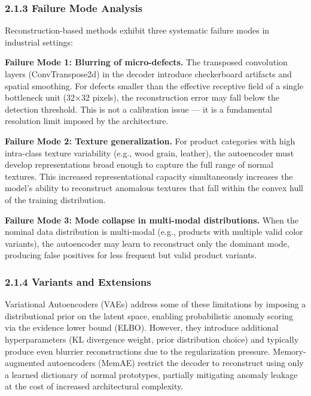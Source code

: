 \documentclass[12pt, a4paper, oneside]{report}
\begin{document}
\subsubsection{2.1.3 Failure Mode Analysis}\label{failure-mode-analysis}

Reconstruction-based methods exhibit three systematic failure modes in industrial settings:

\textbf{Failure Mode 1: Blurring of micro-defects.} The transposed convolution layers (ConvTranspose2d) in the decoder introduce checkerboard artifacts and spatial smoothing. For defects smaller than the effective receptive field of a single bottleneck unit (32$\times$32 pixels), the reconstruction error may fall below the detection threshold. This is not a calibration issue --- it is a fundamental resolution limit imposed by the architecture.

\textbf{Failure Mode 2: Texture generalization.} For product categories with high intra-class texture variability (e.g., wood grain, leather), the autoencoder must develop representations broad enough to capture the full range of normal textures. This increased representational capacity simultaneously increases the model's ability to reconstruct anomalous textures that fall within the convex hull of the training distribution.

\textbf{Failure Mode 3: Mode collapse in multi-modal distributions.} When the nominal data distribution is multi-modal (e.g., products with multiple valid color variants), the autoencoder may learn to reconstruct only the dominant mode, producing false positives for less frequent but valid product variants.

\subsubsection{2.1.4 Variants and Extensions}\label{variants-and-extensions}

Variational Autoencoders (VAEs) address some of these limitations by imposing a distributional prior on the latent space, enabling probabilistic anomaly scoring via the evidence lower bound (ELBO). However, they introduce additional hyperparameters (KL divergence weight, prior distribution choice) and typically produce even blurrier reconstructions due to the regularization pressure. Memory-augmented autoencoders (MemAE) restrict the decoder to reconstruct using only a learned dictionary of normal prototypes, partially mitigating anomaly leakage at the cost of increased architectural complexity.
\end{document}
